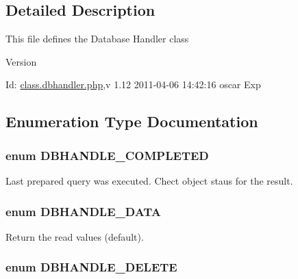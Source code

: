 \subsection{Detailed Description}
This file defines the Database Handler class \begin{DoxyVersion}{Version}

\end{DoxyVersion}
\begin{DoxyParagraph}{Id:}
\hyperlink{class_8dbhandler_8php}{class.dbhandler.php},v 1.12 2011-\/04-\/06 14:42:16 oscar Exp 
\end{DoxyParagraph}


\subsection{Enumeration Type Documentation}
\subsubsection[{DBHANDLE\_\-COMPLETED}]{\setlength{\rightskip}{0pt plus 5cm}enum {\bf DBHANDLE\_\-COMPLETED}}\label{class_8dbhandler_8php_a81abd823ff43027e2a788e4d5993790f}


Last prepared query was executed. Chect object staus for the result. 

\subsubsection[{DBHANDLE\_\-DATA}]{\setlength{\rightskip}{0pt plus 5cm}enum {\bf DBHANDLE\_\-DATA}}\label{class_8dbhandler_8php_acc5178c2a582eafa4ef488ed3394b725}


Return the read values (default). 

\subsubsection[{DBHANDLE\_\-DELETE}]{\setlength{\rightskip}{0pt plus 5cm}enum {\bf DBHANDLE\_\-DELETE}}\label{class_8dbhandler_8php_a978ad3c1b4647dae1fe77c7f8c757da5}



